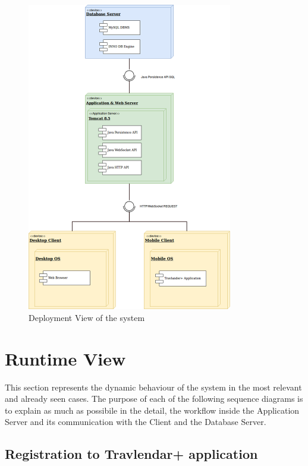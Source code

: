 \documentclass[numbers=noenddot, 12pt, a4paper, oneside]{scrbook}
\begin{document}
\begin{figure}[H]
	\centering
	\includegraphics[width=0.80\textwidth]{images/DeploymentView}
	\caption{Deployment View of the system}
\end{figure}


\section{Runtime View}

This section represents the dynamic behaviour of the system in the most
relevant and already seen cases. The purpose of each of the following sequence diagrams is to explain as much as possibile in the detail, the workflow inside the Application Server and its communication with the Client and the Database Server.

\subsection*{Registration to Travlendar+ application}
\end{document}

